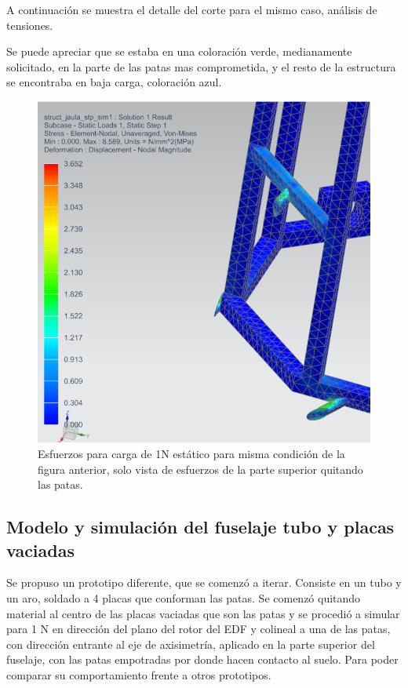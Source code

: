 A continuación se muestra el detalle del corte para el mismo caso, análisis de tensiones.

Se puede apreciar que se estaba en una coloración verde, medianamente solicitado, en la parte de las patas mas comprometida, y el resto de la estructura se encontraba en baja carga, coloración azul.

\begin{figure}[htb]
    \centering
    \includegraphics[height=.5\pdfpageheight]{fig/fea/jaula2.png}
    \caption{Esfuerzos para carga de 1N estático para misma condición de la figura anterior, solo vista de esfuerzos de la parte superior quitando las patas.}
    \label{fig:fea/jaula2}
\end{figure}



\null\newpage
\clearpage

\subsection{Modelo y simulación del fuselaje tubo y placas vaciadas}

Se propuso un prototipo diferente, que se comenzó a iterar. Consiste en un tubo y un aro, soldado a 4 placas que conforman las patas. Se comenzó quitando material al centro de las placas vaciadas que son las patas y se procedió a simular para 1 N en dirección del plano del rotor del EDF y colineal a una de las patas, con dirección entrante al eje de axisimetría, aplicado en la parte superior del fuselaje, con las patas empotradas por donde hacen contacto al suelo. Para poder comparar su comportamiento frente a otros prototipos.

